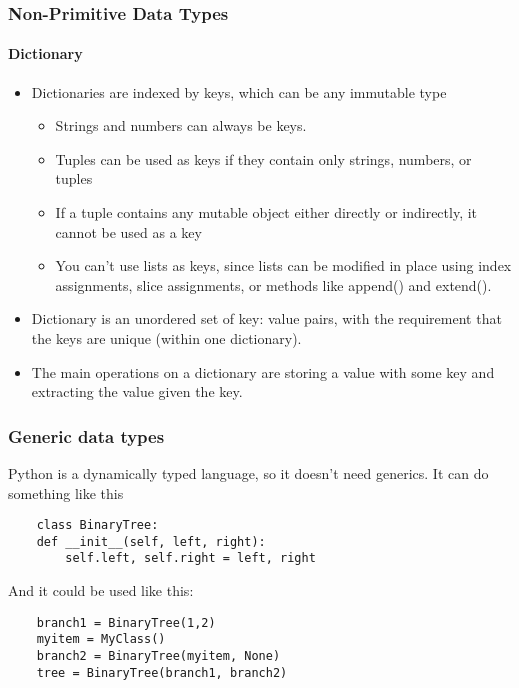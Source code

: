\documentclass{beamer}
\begin{document}
\begin{frame}[fragile]
\frametitle{Non-Primitive Data Types}
\framesubtitle{Dictionary}

\begin{itemize}
	\item Dictionaries are indexed by keys, which can be any immutable type
		\begin{itemize}
		\item Strings and numbers can always be keys. 
		\item Tuples can be used as keys if they contain only strings, numbers, or tuples
		\item If a tuple contains any mutable object either directly or indirectly, it cannot be used as a key
		\item You can’t use lists as keys, since lists can be modified in place using index assignments, slice assignments, or methods like append() and extend().
		\end{itemize}

	\item Dictionary is an unordered set of key: value pairs, with the requirement that the keys are unique (within one dictionary).
		

	\item The main operations on a dictionary are storing a value with some key and extracting the value given the key.
		
	
		
\end{itemize}


\end{frame}
\begin{frame}[fragile]
\frametitle{Generic data types}
Python is a dynamically typed language, so it doesn't need generics. It can do something like this

\begin{verbatim}
	class BinaryTree:
    def __init__(self, left, right):
        self.left, self.right = left, right
\end{verbatim}
And it could be used like this:
\begin{verbatim}
	branch1 = BinaryTree(1,2)
	myitem = MyClass()
	branch2 = BinaryTree(myitem, None)
	tree = BinaryTree(branch1, branch2)
\end{verbatim}
\framesubtitle{}

\end{frame}

	
\end{document}
